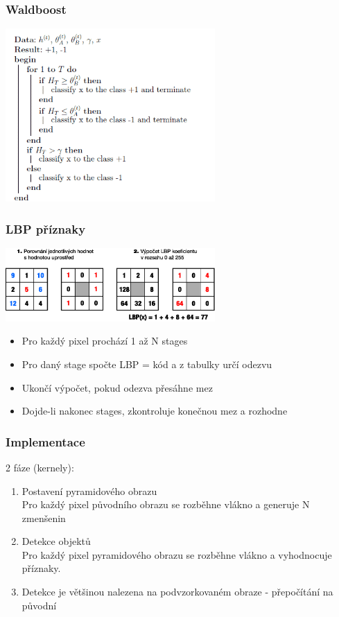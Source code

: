 \documentclass{beamer}
\begin{document}

	\begin{frame}[t,fragile]
		\frametitle{Waldboost}					
		\centering\includegraphics[width=8cm]{img/waldboost.png}
		
	
	\end{frame}
	
	
		\begin{frame}[t,fragile]
		\frametitle{LBP příznaky}	
			
\centering\includegraphics[width=8cm]{img/lbp.eps}

\begin{itemize}
	\item Pro každý pixel prochází 1 až N stages
	\item Pro daný stage spočte LBP = kód a z tabulky určí odezvu
	\item Ukončí výpočet, pokud odezva přesáhne mez
	\item Dojde-li nakonec stages, zkontroluje konečnou mez a rozhodne	
\end{itemize}


								
	\end{frame}		
	
	
	\begin{frame}[t,fragile]
		\frametitle{Implementace}
		2 fáze (kernely):
		\begin{enumerate}		
	    	\item Postavení pyramidového obrazu \\
	    	Pro každý pixel původního obrazu se rozběhne vlákno a generuje N zmenšenin
			\item Detekce objektů \\
			Pro každý pixel pyramidového obrazu se rozběhne vlákno a vyhodnocuje příznaky.		
			\item Detekce je většinou nalezena na podvzorkovaném obraze - přepočítání na původní
		\end{enumerate}
		
	\end{frame}
	
\end{document}
